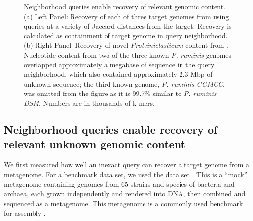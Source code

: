 \begin{figure}
  \centering
  \hspace*{2cm}%
  \hspace*{1cm}%
	\caption{Neighborhood queries enable recovery of relevant genomic content.
  (a) Left Panel: Recovery of each of three target genomes from \podarv
  using queries at a variety of Jaccard distances from the target. Recovery is
  calculated as containment of target genome in query neighborhood.
  (b) Right Panel: Recovery of novel {\em Proteiniclasticum } content
  from \podarv. Nucleotide content from two of the three known {\em P. ruminis} genomes
  overlapped approximately a megabase of sequence in the query neighborhood,
  which also contained approximately 2.3 Mbp of unknown sequence; the third known genome, {\em P. ruminis CGMCC}, was omitted from the figure as it is 99.7\% similar to {\em P. ruminis DSM}. Numbers are in thousands of k-mers.}\label{fig:partial_query}
\end{figure}



\subsection*{Neighborhood queries enable recovery of relevant unknown genomic content}

We first measured how well an inexact query can recover a target genome
from a metagenome. For a benchmark data set, we used the
\podarv data set \cite{podar}. This is a ``mock'' metagenome containing
genomes from 65 strains and species of bacteria and archaea, each
grown independently and rendered into DNA, then combined and sequenced
as a metagenome.  This metagenome is a commonly used
benchmark for assembly \cite{Awad155358,megahit,Seah2015,nurk2017metaspades}.

